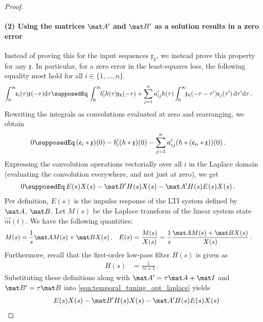 \begin{proof}
\paragraph{(2) Using the matrices $\mat A'$ and $\mat B'$ as a solution results in a zero error}
Instead of proving this for the input sequences $\mathfrak{x}_k$, we instead prove this property for any $\mathfrak{x}$.
In particular, for a zero error in the least-squares loss, the following equality most hold for all $i \in \{1, \ldots, n\}$.
\begin{align*}	
	\int_{0}^\infty \!\! \mathfrak{e}_i(\tau) \mathfrak{x}(-\tau) \mathrm{d}\tau
	&\supposedEq \,
	\int_0^\infty \!\! b'_{i} h(\tau) \mathfrak{x}_k(-\tau) + \sum_{j=1}^n a'_{ij} h(\tau) \int_0^\infty \!\! \mathfrak{x}_k(-\tau - \tau') \mathfrak{e}_j(\tau') \, \mathrm{d}\tau' \mathrm{d}\tau  \,.
\end{align*}
Rewriting the integrals as convolutions evaluated at zero and rearranging, we obtain
\begin{align*}	
	0
	&\supposedEq \, (\mathfrak{e}_i \ast \mathfrak{x})(0) - b'_{i} (h \ast \mathfrak{x})(0) - \sum_{j=1}^n a'_{ij} (h \ast (\mathfrak{e}_n \ast \mathfrak{x}))(0) \,.
\end{align*}
Expressing the convolution operations vectorially over all $i$ in the Laplace domain (evaluating the convolution everywhere, and not just at zero), we get
\begin{align}
	0 &\supposedEq \,  E(s) X(s) - \mat B' H(s) X(s) - \mat A' H(s) E(s) X(s) \,.
	\label{eqn:temporal_tuning_opt_laplace}
\end{align}
Per definition, $E(s)$ is the impulse response of the LTI system defined by $\mat A$, $\mat B$.
Let $M(s)$ be the Laplace transform of the linear system state $\vec m(t)$.
We have the following quantities:
\begin{align*}
	M(s) &= \frac{1}{s} \mat A M(s) + \mat B X(s) \,,
	& E(s) &= \frac{M(s)}{X(s)} = \frac{1}s \frac{\mat A M(s) + \mat B X(s)}{X(s)} \,.
\end{align*}
Furthermore, recall that the first-order low-pass filter $H(s)$ is given as
\begin{align*}
	H(s) &= \frac{1}{\tau s + 1} \,.
\end{align*}
Substituting these definitions along with $\mat A' = \tau \mat A + \mat I$ and $\mat B' = \tau \mat B$ into \cref{eqn:temporal_tuning_opt_laplace} yields
\begin{align*}
	&\hphantom{{}={}} E(s) X(s) - \mat B' H(s) X(s) - \mat A' H(s) E(s) X(s) \\

\end{align*}
\end{proof}
